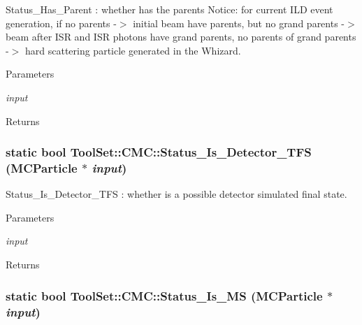 Status\_\-Has\_\-Parent : whether has the parents Notice: for current ILD event generation, if no parents -\/$>$ initial beam have parents, but no grand parents -\/$>$ beam after ISR and ISR photons have grand parents, no parents of grand parents -\/$>$ hard scattering particle generated in the Whizard. 
\begin{DoxyParams}{Parameters}
\item[{\em input}]\end{DoxyParams}
\begin{DoxyReturn}{Returns}

\end{DoxyReturn}
\hypertarget{classToolSet_1_1CMC_a23a38c3094037dd6660223494c8a5827}{
\subsubsection[{Status\_\-Is\_\-Detector\_\-TFS}]{\setlength{\rightskip}{0pt plus 5cm}static bool ToolSet::CMC::Status\_\-Is\_\-Detector\_\-TFS (MCParticle $\ast$ {\em input})}}
\label{classToolSet_1_1CMC_a23a38c3094037dd6660223494c8a5827}


Status\_\-Is\_\-Detector\_\-TFS : whether is a possible detector simulated final state. 
\begin{DoxyParams}{Parameters}
\item[{\em input}]\end{DoxyParams}
\begin{DoxyReturn}{Returns}

\end{DoxyReturn}
\hypertarget{classToolSet_1_1CMC_ae0ceba81f34f1a164b1d8ce719c92e05}{
\subsubsection[{Status\_\-Is\_\-MS}]{\setlength{\rightskip}{0pt plus 5cm}static bool ToolSet::CMC::Status\_\-Is\_\-MS (MCParticle $\ast$ {\em input})}}
\label{classToolSet_1_1CMC_ae0ceba81f34f1a164b1d8ce719c92e05}


